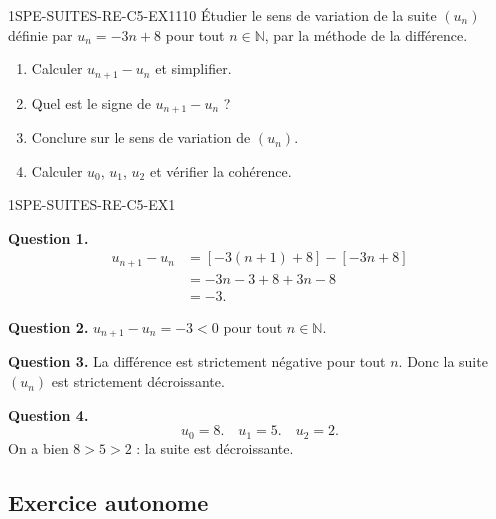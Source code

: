 \begin{exercice}{1SPE-SUITES-RE-C5-EX1}{1}{10}
Étudier le sens de variation de la suite $(u_n)$ définie par $u_n = -3n + 8$ pour tout $n \in \mathbb{N}$, par la méthode de la différence.
\begin{enumerate}
  \item Calculer $u_{n+1} - u_n$ et simplifier.
  \item Quel est le signe de $u_{n+1} - u_n$ ?
  \item Conclure sur le sens de variation de $(u_n)$.
  \item Calculer $u_0$, $u_1$, $u_2$ et vérifier la cohérence.
\end{enumerate}
\end{exercice}


\begin{corrige}{1SPE-SUITES-RE-C5-EX1}


\textbf{Question 1.}
\begin{align*}
u_{n+1} - u_n &= [-3(n+1) + 8] - [-3n + 8] \\
               &= -3n - 3 + 8 + 3n - 8 \\
               &= -3.
\end{align*}

\textbf{Question 2.} $u_{n+1} - u_n = -3 < 0$ pour tout $n \in \mathbb{N}$.


\textbf{Question 3.} La différence est strictement négative pour tout $n$. Donc la suite $(u_n)$ est strictement décroissante.

\textbf{Question 4.}
\[
u_0 = 8. \quad u_1 = 5. \quad u_2 = 2.
\]
On a bien $8 > 5 > 2$ : la suite est décroissante. \checkmark

\end{corrige}

\subsection*{Exercice autonome}

